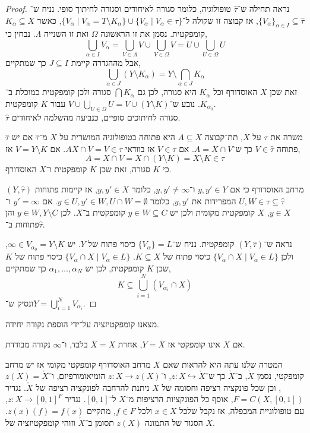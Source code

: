 \begin{proof}
	נראה תחילה ש־$\hat{\tau}$ טופולוגיה, כלומר סגורה לאיחודים וסגורה לחיתוך סופי.
	נניח ש־${\{ V_{\alpha} \}}_{\alpha \in I} \subseteq \hat{\tau}$, אז קבוצה זו שקולה ל־$\{ V_{\alpha} \mid V_{\alpha} = T \setminus K_{\alpha} \} \cup \{ V_{\alpha} \mid V_{\alpha} \in \tau \}$,
	כאשר $K_{\alpha} \subseteq X$ קומפקטית. נסמן את זו הראשונה $\Omega$ ואת זו השנייה $\Lambda$.
	נבחין כי,
	\[
		\bigcup_{\alpha \in I} V_{\alpha}
		= \bigcup_{V \in \Lambda} V \cup \bigcup_{V \in \Omega} V
		= U \cup \bigcup_{U \in \Omega} U
	\]
	אבל מההגדרה קיימת $J \subseteq I$ כך שמתקיים,
	\[
		\bigcup_{\alpha \in J} (Y \setminus K_{\alpha})
		= Y \setminus \bigcap_{\alpha \in J} K_{\alpha}
	\]
	זאת שכן $X$ האוסדורף וכל $K_{\alpha}$ היא סגורה, לכן גם $\bigcap K_{\alpha}$ סגורה ולכן קומפקטית כמוכלת ב־$K_{\alpha_0}$.
	נובע ש־$V \cup \bigcup_{U \in \Omega} U = V \cup (Y \setminus K)$ עבור $K$ קומפקטית. \\
	$\hat{\tau}$ סגורה לחיתוכים סופיים, כנביעה מהשלמה לאיחודים.

	$\hat{\tau}$ משרה את $\tau$ על $X$,
	תת־קבוצה $A \subseteq X$ היא פתוחה בטופולוגיה המושרית על $X$ מ־$\hat{\tau}$ אם יש פתוחה $V \in \hat{\tau}$ כך ש־$A = X \cap V$.
	אם $V \in \tau$ אז בוודאי $A X \cap V = V \in \tau$.
	אם $V = Y \setminus K$ אז,
	\[
		A
		= X \cap V
		= X \cap (Y \setminus K)
		= X \setminus K
		\in \tau
	\]
	כי $K$ סגורה, זאת שכן $K$ קומפקטית ו־$X$ האוסדורף.

	$(Y, \hat{\tau})$ מרחב האוסדורף כי אם $y, y' \in Y$ ו־$y, y' \ne \infty$, כלומר $y, y' \in X$,
	אז קיימות פתוחות $U, W \in \tau \subseteq \hat{\tau}$ המפרידות את $y, y'$, כלומר $y \in U, y' \in W, U \cap W = \emptyset$.
	אם $y' = \infty$ ו־$y \in X$, $X$ קומפקטית מקומית ולכן יש $y \in W \subseteq C$ קומפקטית ב־$X$.
	לכן $y \in W, Y \setminus C$ והן פתוחות ב־$\hat{\tau}$.

	נראה ש־$(Y, \hat{\tau})$ קומפקטית.
	נניח ש־$\{ V_{\alpha} \} = L$ כיסוי פתוח של $Y$.
	יש $\infty \in V_{\alpha_0} = Y \setminus K$, ולכן $\{ V_{\alpha} \cap X \mid V_{\alpha} \in L \}$ כיסוי פתוח של $K \subseteq X$.
	$\{ V_{\alpha} \cap X \mid V_{\alpha} \in L \}$ כיסוי פתוח של $K$ שכן $K$ קומפקטית,
	לכן יש $\alpha_1, \ldots, \alpha_N$ כך שמתקיים,
	\[
		K \subseteq \bigcup_{i = 1}^N (V_{\alpha_i} \cap X)
	\]
	ונסיק ש־$Y = \bigcup_{i = 1}^N V_{\alpha_i}$.
\end{proof}
מצאנו קומפקטיזציה על־ידי הוספת נקודה יחידה.
\begin{remark}
	אם $X$ אינו קומפקטי אז $Y = \overline{X}$,
	אחרת $\overline{X} = X$ בלבד, ו־$\infty$ נקודה מבודדת.
\end{remark}
המטרה שלנו עתה היא להראות שאם $X$ מרחב האוסדורף קומפקטי מקומי אז יש מרחב קומפקטי, נסמן $\check{X}$, ב־$\check{X}$ כך ש־$z : X \hookrightarrow \check{X}$,
ו־$z : X \to z(X)$ הומיאומורפיזם, ו־$\overline{z(X)} = \check{X}$,
וכן שכל פונקציה רציפה וחסומה של $X$ ניתנת להרחבה לפונקציה רציפה של $\check{X}$.
נגדיר $F = C(X, [0, 1])$, אוסף כל הפונקציות הרציפות מ־$X$ ל־$[0, 1]$.
נגדיר $z : X \to {[0, 1]}^F$, עם טופולוגיית המכפלה, אז נקבל שלכל $x \in X$ ולכל $f \in F$, מתקיים $z(x)(f) = f(x)$.
הסגור של התמונה $z(X)$ תסומן ב־$\check{X}$ וזוהי קומפקטיזציה של $X$.

